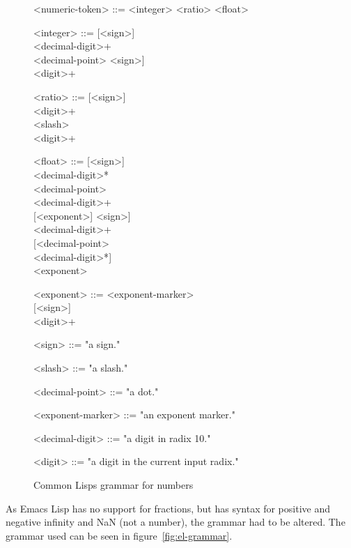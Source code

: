 \documentclass[a4paper,10pt,twoside]{report}
\newcommand{\el}{Emacs Lisp}
\newcommand{\cl}{Common Lisp}
\begin{document}
\begin{figure}
  \begin{grammar}
    <numeric-token> ::= <integer> \alt <ratio> \alt <float>
  
    <integer> ::= {[}<sign>{]} \\
    <decimal-digit>+ \\
    <decimal-point>
    \alt {[}<sign>{]} \\
    <digit>+

    <ratio> ::= {[}<sign>{]} \\
    <digit>+ \\
    <slash> \\
    <digit>+
  
    <float> ::= {[}<sign>{]} \\
    <decimal-digit>* \\
    <decimal-point> \\
    <decimal-digit>+ \\
    {[}<exponent>{]}
    \alt {[}<sign>{]} \\
    <decimal-digit>+ \\
    {[}<decimal-point> \\
    <decimal-digit>*{]} \\
    <exponent>
  
    <exponent> ::= <exponent-marker> \\
    {[}<sign>{]} \\
    <digit>+
                                       
    <sign> ::= "a sign."
  
    <slash> ::= "a slash."
  
    <decimal-point> ::= "a dot."
  
    <exponent-marker> ::= "an exponent marker."
  
    <decimal-digit> ::= "a digit in radix 10."
  
    <digit> ::= "a digit in the current input radix."
  \end{grammar}
  
  \caption{\cl{}s grammar for numbers}
  \label{fig:cl-grammar}
\end{figure}
As \el{} has no support for fractions, but has syntax for positive and negative
infinity and NaN (not a number), the grammar had to be altered.  The grammar
used can be seen in figure~\ref{fig:el-grammar}.
\end{document}
